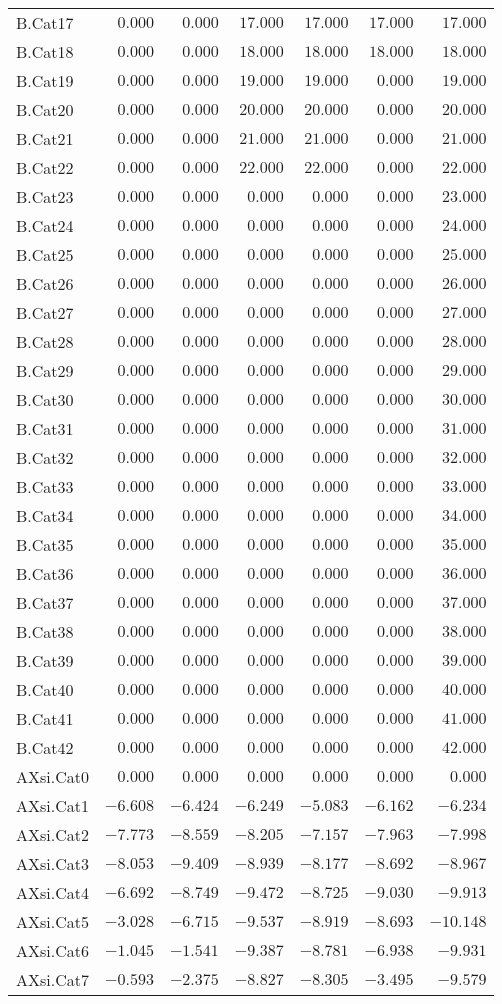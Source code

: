 \documentclass[6pt]{article}
\begin{document}
{\begin{longtable}{lrrrrrr}
B.Cat17&$ 0.000$&$ 0.000$&$17.000$&$17.000$&$17.000$&$ 17.000$\tabularnewline
B.Cat18&$ 0.000$&$ 0.000$&$18.000$&$18.000$&$18.000$&$ 18.000$\tabularnewline
B.Cat19&$ 0.000$&$ 0.000$&$19.000$&$19.000$&$ 0.000$&$ 19.000$\tabularnewline
B.Cat20&$ 0.000$&$ 0.000$&$20.000$&$20.000$&$ 0.000$&$ 20.000$\tabularnewline
B.Cat21&$ 0.000$&$ 0.000$&$21.000$&$21.000$&$ 0.000$&$ 21.000$\tabularnewline
B.Cat22&$ 0.000$&$ 0.000$&$22.000$&$22.000$&$ 0.000$&$ 22.000$\tabularnewline
B.Cat23&$ 0.000$&$ 0.000$&$ 0.000$&$ 0.000$&$ 0.000$&$ 23.000$\tabularnewline
B.Cat24&$ 0.000$&$ 0.000$&$ 0.000$&$ 0.000$&$ 0.000$&$ 24.000$\tabularnewline
B.Cat25&$ 0.000$&$ 0.000$&$ 0.000$&$ 0.000$&$ 0.000$&$ 25.000$\tabularnewline
B.Cat26&$ 0.000$&$ 0.000$&$ 0.000$&$ 0.000$&$ 0.000$&$ 26.000$\tabularnewline
B.Cat27&$ 0.000$&$ 0.000$&$ 0.000$&$ 0.000$&$ 0.000$&$ 27.000$\tabularnewline
B.Cat28&$ 0.000$&$ 0.000$&$ 0.000$&$ 0.000$&$ 0.000$&$ 28.000$\tabularnewline
B.Cat29&$ 0.000$&$ 0.000$&$ 0.000$&$ 0.000$&$ 0.000$&$ 29.000$\tabularnewline
B.Cat30&$ 0.000$&$ 0.000$&$ 0.000$&$ 0.000$&$ 0.000$&$ 30.000$\tabularnewline
B.Cat31&$ 0.000$&$ 0.000$&$ 0.000$&$ 0.000$&$ 0.000$&$ 31.000$\tabularnewline
B.Cat32&$ 0.000$&$ 0.000$&$ 0.000$&$ 0.000$&$ 0.000$&$ 32.000$\tabularnewline
B.Cat33&$ 0.000$&$ 0.000$&$ 0.000$&$ 0.000$&$ 0.000$&$ 33.000$\tabularnewline
B.Cat34&$ 0.000$&$ 0.000$&$ 0.000$&$ 0.000$&$ 0.000$&$ 34.000$\tabularnewline
B.Cat35&$ 0.000$&$ 0.000$&$ 0.000$&$ 0.000$&$ 0.000$&$ 35.000$\tabularnewline
B.Cat36&$ 0.000$&$ 0.000$&$ 0.000$&$ 0.000$&$ 0.000$&$ 36.000$\tabularnewline
B.Cat37&$ 0.000$&$ 0.000$&$ 0.000$&$ 0.000$&$ 0.000$&$ 37.000$\tabularnewline
B.Cat38&$ 0.000$&$ 0.000$&$ 0.000$&$ 0.000$&$ 0.000$&$ 38.000$\tabularnewline
\newpage
B.Cat39&$ 0.000$&$ 0.000$&$ 0.000$&$ 0.000$&$ 0.000$&$ 39.000$\tabularnewline
B.Cat40&$ 0.000$&$ 0.000$&$ 0.000$&$ 0.000$&$ 0.000$&$ 40.000$\tabularnewline
B.Cat41&$ 0.000$&$ 0.000$&$ 0.000$&$ 0.000$&$ 0.000$&$ 41.000$\tabularnewline
B.Cat42&$ 0.000$&$ 0.000$&$ 0.000$&$ 0.000$&$ 0.000$&$ 42.000$\tabularnewline
AXsi.Cat0&$ 0.000$&$ 0.000$&$ 0.000$&$ 0.000$&$ 0.000$&$  0.000$\tabularnewline
AXsi.Cat1&$-6.608$&$-6.424$&$-6.249$&$-5.083$&$-6.162$&$ -6.234$\tabularnewline
AXsi.Cat2&$-7.773$&$-8.559$&$-8.205$&$-7.157$&$-7.963$&$ -7.998$\tabularnewline
AXsi.Cat3&$-8.053$&$-9.409$&$-8.939$&$-8.177$&$-8.692$&$ -8.967$\tabularnewline
AXsi.Cat4&$-6.692$&$-8.749$&$-9.472$&$-8.725$&$-9.030$&$ -9.913$\tabularnewline
AXsi.Cat5&$-3.028$&$-6.715$&$-9.537$&$-8.919$&$-8.693$&$-10.148$\tabularnewline
AXsi.Cat6&$-1.045$&$-1.541$&$-9.387$&$-8.781$&$-6.938$&$ -9.931$\tabularnewline
AXsi.Cat7&$-0.593$&$-2.375$&$-8.827$&$-8.305$&$-3.495$&$ -9.579$\tabularnewline

\end{longtable}}
\end{document}
